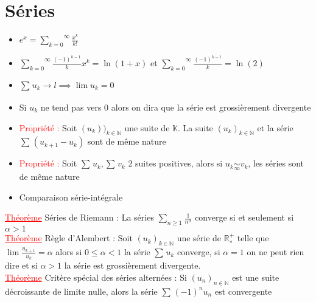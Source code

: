 \documentclass[a4paper, 11pt, french]{article}
\newcommand{\R}{\mathbb{R}}
\newcommand{\N}{\mathbb{N}}
\newcommand{\K}{\mathbb{K}}
\newcommand{\al}{\alpha}
\newcommand{\som}[2]{\overset{#2}{\underset{#1}{\sum}}}
\newcommand{\thm}{\textcolor{red}{\underline{Théorème} }}
\newcommand{\ppt}{\textcolor{red}{Propriété : }}
\newcommand{\limit}[1]{\underset{#1}{\rightarrow}}
\newcommand{\eq}[1]{\underset{#1}{\sim}}
\newcommand{\inv}[1]{\frac{1}{#1}}
\begin{document}
	\section*{Séries}
	\begin{itemize}
 		\item $e^x=\som{k=0}{\infty}\frac{x^k}{k!}$
 		\item $\som{k=0}{\infty}\frac{(-1)^{k-1}}{k}x^k=\ln(1+x)$ et $\som{k=0}{\infty}\frac{(-1)^{k-1}}{k}=\ln(2)$
		\item $\som{}{}u_k \limit{}l \implies \lim u_k=0$
		\item Si $u_k$ ne tend pas vers 0 alors on dira que la série est grossièrement divergente
		\item \ppt Soit $(u_k))_{k \in \N}$ une suite de $\K$. La suite $(u_k)_{k \in \N}$ et la série $\som{}{}(u_{k+1}-u_k)$ sont de même nature
		\item \ppt Soit $\som{}{}u_k,\som{}{}v_k$ 2 suites positives, alors si $u_k \eq{\infty} v_k$, les séries sont de même nature
		\item Comparaison série-intégrale
	\end{itemize}
	 \thm Séries de Riemann : La séries $\som{n\geqslant 1}{} \inv{n^\al}$ converge si et seulement si $\al > 1$ \\
	 \thm Règle d'Alembert : Soit $(u_k)_{k \in \N}$ une série de $\R_*^+$ telle que $\lim \frac{u_{k+1}}{u_k}=\al$ alors si $0 \leqslant \al <1$ la série $\som{}{}u_k$ converge, si $\al=1$ on ne peut rien dire et si $\al>1$ la série est grossièrement divergente. \\
	 \thm Critère spécial des séries alternées : Si $(u_n)_{n \in \N}$ est une suite décroissante de limite nulle, alors la série $\som{}{}(-1)^nu_n$ est convergente
\end{document}

